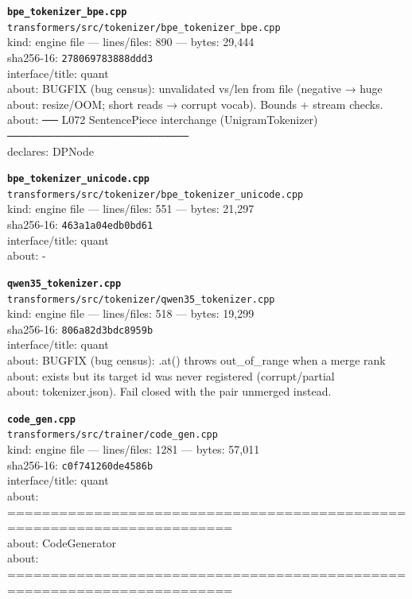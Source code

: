 \noindent\textbf{\texttt{bpe\_tokenizer\_bpe.cpp}}\\
\texttt{transformers/src/tokenizer/bpe\_tokenizer\_bpe.cpp}\\
kind: engine file --- lines/files: 890 --- bytes: 29,444\\
sha256-16: \texttt{278069783888ddd3}\\
interface/title: quant\\
about: BUGFIX (bug census): unvalidated vs/len from file (negative → huge\\
about: resize/OOM; short reads → corrupt vocab). Bounds + stream checks.\\
about: ── L072 SentencePiece interchange (UnigramTokenizer) ───────────────────────\\
declares: DPNode\\
\vspace*{6.0pt}

\noindent\textbf{\texttt{bpe\_tokenizer\_unicode.cpp}}\\
\texttt{transformers/src/tokenizer/bpe\_tokenizer\_unicode.cpp}\\
kind: engine file --- lines/files: 551 --- bytes: 21,297\\
sha256-16: \texttt{463a1a04edb0bd61}\\
interface/title: quant\\
about: -\\
\vspace*{6.0pt}

\noindent\textbf{\texttt{qwen35\_tokenizer.cpp}}\\
\texttt{transformers/src/tokenizer/qwen35\_tokenizer.cpp}\\
kind: engine file --- lines/files: 518 --- bytes: 19,299\\
sha256-16: \texttt{806a82d3bdc8959b}\\
interface/title: quant\\
about: BUGFIX (bug census): .at() throws out\_of\_range when a merge rank\\
about: exists but its target id was never registered (corrupt/partial\\
about: tokenizer.json). Fail closed with the pair unmerged instead.\\
\vspace*{6.0pt}

\noindent\textbf{\texttt{code\_gen.cpp}}\\
\texttt{transformers/src/trainer/code\_gen.cpp}\\
kind: engine file --- lines/files: 1281 --- bytes: 57,011\\
sha256-16: \texttt{c0f741260de4586b}\\
interface/title: quant\\
about: ========================================================================\\
about: CodeGenerator\\
about: ========================================================================\\
\vspace*{6.0pt}
\newpage

